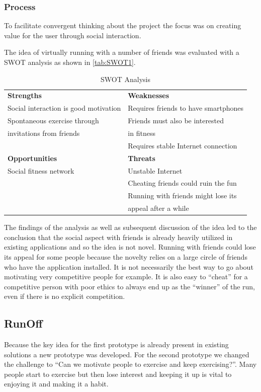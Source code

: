 \subsubsection{Process}
To facilitate convergent thinking about the project the focus was on creating value for the user through social interaction. 

The idea of virtually running with a number of friends was evaluated with a \ac{SWOT} analysis as shown in \autoref{tab:SWOT1}.

\begin{table}[!ht]
	\begin{tabular}{| l | l |}
		\hline
		\textbf{Strengths} & \textbf{Weaknesses} \\ 
		Social interaction is good motivation & Requires friends to have smartphones \\
		Spontaneous exercise through & Friends must also be interested \\
		invitations from friends &  in fitness \\
		& Requires stable Internet connection \\ \hline
		\textbf{Opportunities} & \textbf{Threats} \\ 
		Social fitness network & Unstable Internet \\
		& Cheating friends could ruin the fun \\
		& Running with friends might lose its \\
		& appeal after a while \\
		\hline
	\end{tabular}
	\caption{SWOT Analysis}
	\label{tab:SWOT1}
\end{table}

The findings of the analysis as well as subsequent discussion of the idea led to the conclusion that the social aspect with friends is already heavily utilized in existing applications and so the idea is not novel. Running with friends could lose its appeal for some people because the novelty relies on a large circle of friends who have the application installed. It is not necessarily the best way to go about motivating very competitive people for example. It is also easy to ``cheat'' for a competitive person with poor ethics to always end up as the ``winner'' of the run, even if there is no explicit competition.

\subsection{RunOff}
Because the key idea for the first prototype is already present in existing solutions a new prototype was developed. For the second prototype we changed the challenge to ``Can we motivate people to exercise and keep exercising?''. Many people start to exercise but then lose interest and keeping it up is vital to enjoying it and making it a habit. 

